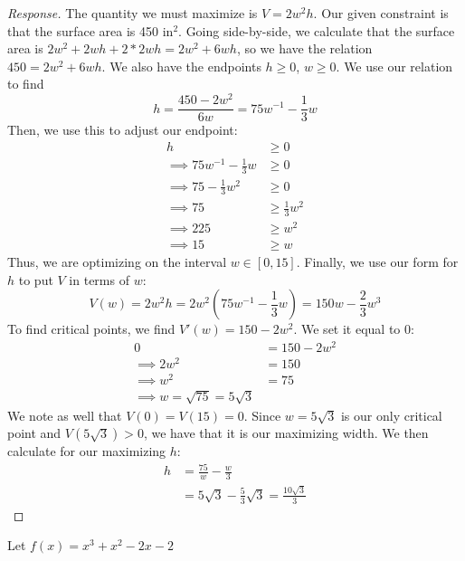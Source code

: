 \documentclass[11pt]{exam}
\begin{document}
\begin{questions}
\begin{proof}[Response]
The quantity we must maximize is $V=2w^2h$. Our given constraint is that the surface area is 450 in${}^2$. Going side-by-side, we calculate that the surface area is $2w^2+2wh+2*2wh=2w^2+6wh$, so we have the relation $450=2w^2+6wh$. We also have the endpoints $h\geq 0$, $w\geq 0$. We use our relation to find $$h=\frac{450-2w^2}{6w}=75w^{-1}-\frac{1}{3}w$$
Then, we use this to adjust our endpoint:
\begin{align*}
	h&\geq 0\\
	\implies 75w^{-1}-\frac{1}{3}w&\geq 0\\
	\implies 75-\frac{1}{3}w^2&\geq 0\\
	\implies 75&\geq \frac{1}{3}w^2\\
	\implies 225&\geq w^2\\
	\implies 15&\geq w
\end{align*}
Thus, we are optimizing on the interval $w\in [0,15]$. Finally, we use our form for $h$ to put $V$ in terms of $w$:
$$V(w)=2w^2h=2w^2(75w^{-1}-\frac{1}{3}w)=150w-\frac{2}{3}w^3$$
To find critical points, we find $V'(w)=150-2w^2$. We set it equal to $0$:
\begin{align*}
	0&=150-2w^2\\
	\implies 2w^2&=150\\
	\implies w^2&=75\\
	\implies w=\sqrt{75}=5\sqrt{3}
\end{align*}
We note as well that $V(0)=V(15)=0$. Since $w=5\sqrt{3}$ is our only critical point and $V(5\sqrt3)>0$, we have that it is our maximizing width. We then calculate for our maximizing $h$:\begin{align*}
	h&=\frac{75}{w}-\frac{w}{3}\\
	&=5\sqrt{3}-\frac{5}{3}\sqrt{3}=\frac{10\sqrt{3}}{3}
\end{align*}
\end{proof}
\newpage
\addpoints
\question Let $f(x)=x^3+x^2-2x-2$
\end{questions}
\end{document}
